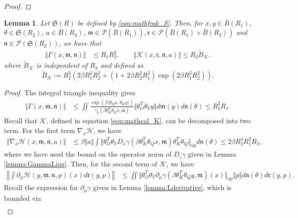 \documentclass{article}
\newtheorem{lemma}[theorem]{Lemma}
\begin{document}
\begin{appendices}
\begin{proof}
\end{proof}
\begin{lemma}\label{lemma:BoundedGamma}
Let $\mathfrak{S}(R)$ be defined by \ref{eqn:mathfrak_S}. Then, for $x,y \in \bar B(R_1)$, $\theta\in \mathfrak{S}(R_2)$, $a\in \bar B(R_3)$, $\mathfrak{m}\in \mathcal P(\bar B(R_1)), \mathfrak{r}\in \mathcal P(\bar B(R_1)\times \bar B(R_3))$ and $\mathfrak{n}\in \mathcal P(\mathfrak{S}(R_2))$, we have that
    \begin{align*}
    \Vert \Gamma(x,\mathfrak{m},\mathfrak{n})\Vert &\le R_1R_2^2,\qquad
\Vert \mathcal K(x,\mathfrak{r},\mathfrak{n},a)\Vert\le R_3\tilde{B}_\mathcal{K} .
    \end{align*}
where $\tilde{B}_\mathcal K$ is independent of $R_3$ and defined as
\[
 \tilde{B}_\mathcal K:=R_2^2\left(2\beta R_1^2R_2^2+(1+2\beta R_2^2R_1^2)\exp(2\beta R_1^2R_2^2) \right).
\] 
\end{lemma}
\begin{proof}
The integral triangle inequality gives
\begin{align*}
    \Vert \Gamma(x,\mathfrak{m}, \mathfrak{n})\Vert &\le \iint \frac{\exp(\beta\langle  \theta_Qx, \theta_K y \rangle)}{\gamma_2(\beta \theta_K^T\theta_Qx,\mathfrak{m})}\Vert \theta_O^T\theta_Vy\Vert d\mathfrak{m}(y)d\mathfrak{n}(\theta) \le R_2^2R_1.
\end{align*}
Recall that $\mathcal K$, defined in equation \eqref{eqn:mathcal_K}, can be decomposed into two term. For the first term $\nabla_x \mathcal H$, we have 
\begin{align}
    \Vert \nabla_x \mathcal H(x,\mathfrak{m}, \mathfrak{n},a)\Vert&\le \beta \Vert a\Vert \int \Vert \theta_O^T\theta_VD_x\gamma(\beta \theta_K^T\theta_Qx,\mathfrak{m})\theta_K^T\theta_Q\Vert_\mathrm{op} d\mathfrak{n}(\theta)\le 2\beta R_2^4 R_1^2R_3,\label{eqn:boundmathcal_K1}
\end{align}
where we have used the bound on the operator norm of $D_z\gamma$ given in Lemma \ref{lemma:GammaLipz}. Then, for the second term of $\mathcal K$, we have
\begin{align*}
    \left\Vert \int \partial_\mu \mathcal H(y,\mathfrak{m}, \mathfrak{n},p)(x)d\mathfrak{r}(y,p)\right\Vert&\le \iint \Vert \theta_O^T\theta_V\partial_\mu\gamma(\beta \theta_K^T\theta_Qy,\mathfrak{m})(x)\Vert_\mathrm{op}\Vert p\Vert d\mathfrak{n}(\theta)d\mathfrak{r}(y,p).
\end{align*}
Recall the expression for $\partial_\mu \gamma$ given in Lemma \ref{lemma:Lderivative}, which is bounded via
\begin{align}\label{eqn:bound_gamma_mu}

\end{align}
\end{proof}
\end{appendices}
\end{document}
